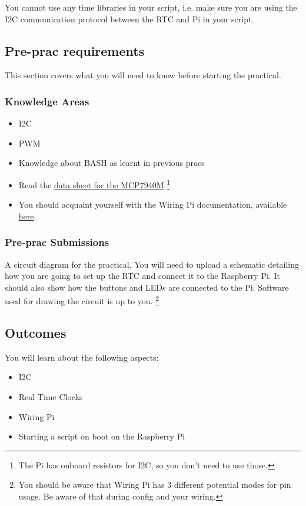 You cannot use any time libraries in your script, i.e. make sure you are using the I2C communication protocol between the RTC and Pi in your script.

\subsection{Pre-prac requirements}
This section covers what you will need to know before starting the practical.
\subsubsection{Knowledge Areas}
\begin{itemize}
    \item I2C
    \item PWM
    \item Knowledge about BASH as learnt in previous pracs
    \item Read the \href{http://ww1.microchip.com/downloads/en/DeviceDoc/MCP7940M-Low-Cost\%20I2C-RTCC-with-SRAM-20002292C.pdf}{data sheet for the MCP7940M} \footnote {The Pi has onboard resistors for I2C, so you don't need to use those.}
    \item You should acquaint yourself with the Wiring Pi documentation, available \href{http://wiringpi.com/reference/}{here}.
\end{itemize}

\subsubsection{Pre-prac Submissions}
A circuit diagram for the practical. You will need to upload a schematic detailing how you are going to set up the RTC and connect it to the Raspberry Pi. It should also show how the buttons and LEDs are connected to the Pi. Software used for drawing the circuit is up to you. \footnote{You should be aware that Wiring Pi has 3 different potential modes for pin usage. Be aware of that during config and your wiring.}

\subsection{Outcomes}
You will learn about the following aspects:
\begin{itemize}
    \item I2C
    \item Real Time Clocks
    \item Wiring Pi
    \item Starting a script on boot on the Raspberry Pi
\end{itemize}

